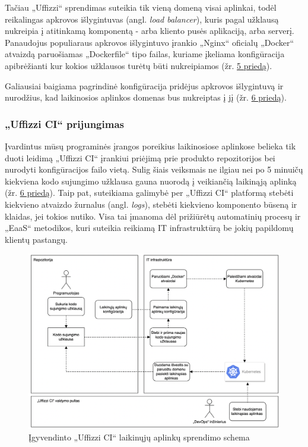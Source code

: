 \documentclass{VUMIFPSkursinis}
\begin{document}
Tačiau „Uffizzi“ sprendimas suteikia tik vieną domeną visai aplinkai, todėl reikalingas apkrovos išlygintuvas (angl. \textit{load balancer}), kuris pagal užklausą nukreipia į atitinkamą komponentą - arba kliento pusės aplikaciją, arba serverį. Panaudojus populiaraus apkrovos išlygintuvo įrankio „Nginx“ oficialų „Docker“ atvaizdą paruošiamas „Dockerfile“ tipo failas, kuriame įkeliama konfigūracija apibrėžianti kur kokios užklausos turėtų būti nukreipiamos (žr. \hyperref[priedas5]{5 priedą}). 

Galiausiai baigiama pagrindinė konfigūracija pridėjus apkrovos išlygintuvą ir nurodžius, kad laikinosios aplinkos domenas bus nukreiptas į jį (žr. \hyperref[priedas6]{6 priedą}).

    \subsubsection{„Uffizzi CI“ prijungimas}

Įvardintus mūsų programinės įrangos poreikius laikinosiose aplinkose belieka tik duoti leidimą „Uffizzi CI“ įrankiui priėjimą prie produkto repozitorijos bei nurodyti konfigūracijos failo vietą. Sulig šiais veiksmais ne ilgiau nei po 5 minuičų kiekviena kodo sujungimo užklausa gauna nuorodą į veikiančią laikinąją aplinką (žr. \hyperref[priedas6]{6 priedą}). Taip pat, suteikiama galimybė per „Uffizzi CI“ platformą stebėti kiekvieno atvaizdo žurnalus (angl. \textit{logs}), stebėti kiekvieno komponento būseną ir klaidas, jei tokios nutiko. Visa tai įmanoma dėl prižiūrėtų automatinių procesų ir „EaaS“ metodikos, kuri suteikia reikiamą IT infrastruktūrą be jokių papildomų klientų pastangų.

\begin{figure}[H]
    \centering
    \includegraphics[scale=0.55]{img/Veikimas.png}
    \caption{Įgyvendinto „Uffizzi CI“ laikinųjų aplinkų sprendimo schema}
    \label{img:mlp}
\end{figure}
\end{document}
